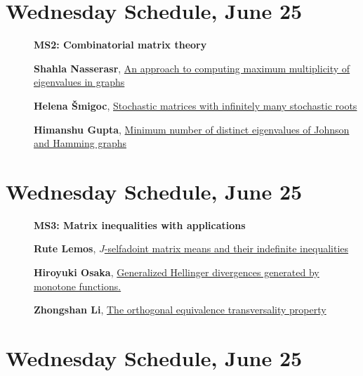 \documentclass[ILAS2025-program.tex]{subfiles}
\begin{document}
\section*{Wednesday Schedule, June 25 }
        
        \begin{description}
    \item[] {\color{mstitle}\textbf{MS2: Combinatorial matrix theory}} 
    \item[] \hypertarget{up0262}{}\textbf{Shahla Nasserasr}, \hyperlink{down0262}{An approach to computing maximum multiplicity of eigenvalues in graphs}
        \item[] \hypertarget{up0263}{}\textbf{Helena Šmigoc}, \hyperlink{down0263}{Stochastic matrices with infinitely many stochastic roots}
        \item[] \hypertarget{up0264}{}\textbf{Himanshu Gupta}, \hyperlink{down0264}{Minimum number of distinct eigenvalues of Johnson and Hamming graphs}
        \end{description}
    \newpage

\section*{Wednesday Schedule, June 25 }
        
        \begin{description}
    \item[] {\color{mstitle}\textbf{MS3: Matrix inequalities with applications}} 
    \item[] \hypertarget{up0265}{}\textbf{Rute Lemos}, \hyperlink{down0265}{$J$-selfadoint matrix means and their indefinite inequalities}
        \item[] \hypertarget{up0266}{}\textbf{Hiroyuki Osaka}, \hyperlink{down0266}{Generalized Hellinger divergences generated by monotone functions.
}
        \item[] \hypertarget{up0267}{}\textbf{Zhongshan Li}, \hyperlink{down0267}{The orthogonal equivalence transversality property 
}
        \end{description}
    \newpage

\section*{Wednesday Schedule, June 25 }
        
\end{document}
